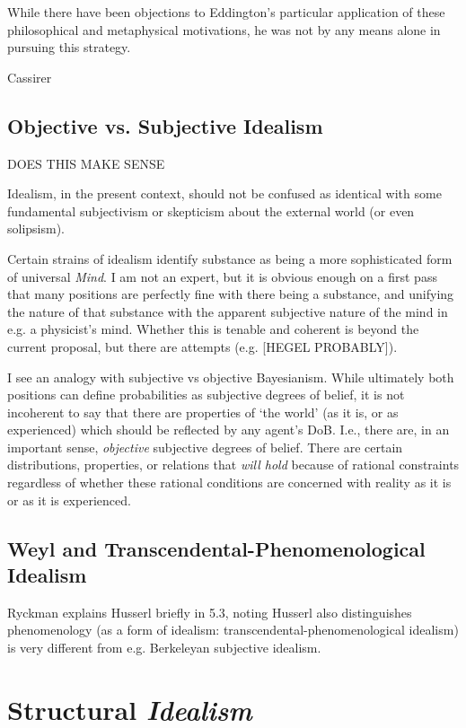 \documentclass{article}
\begin{document}
While there have been objections to Eddington's particular application of these philosophical and metaphysical motivations, he was not by any means alone in pursuing this strategy.  



Cassirer

\subsection{Objective vs. Subjective Idealism}

DOES THIS MAKE SENSE

Idealism, in the present context, should not be confused as identical with some fundamental subjectivism or skepticism about the external world (or even solipsism).

Certain strains of idealism identify substance as being a more sophisticated form of universal \emph{Mind}.  I am not an expert, but it is obvious enough on a first pass that many positions are perfectly fine with there being a substance, and unifying the nature of that substance with the apparent subjective nature of the mind in e.g. a physicist's mind.  Whether this is tenable and coherent is beyond the current proposal, but there are attempts (e.g. [HEGEL PROBABLY]).

I see an analogy with subjective vs objective Bayesianism.  While ultimately both positions can define probabilities as subjective degrees of belief, it is not incoherent to say that there are properties of `the world' (as it is, or as experienced) which should be reflected by any agent's DoB.  I.e., there are, in an important sense, \emph{objective} subjective degrees of belief.  There are certain distributions, properties, or relations that \emph{will hold} because of rational constraints regardless of whether these rational conditions are concerned with reality as it is or as it is experienced.



\subsection{Weyl and Transcendental-Phenomenological Idealism}

Ryckman explains Husserl briefly in 5.3, noting Husserl also distinguishes phenomenology (as a form of idealism: transcendental-phenomenological idealism) is very different from e.g. Berkeleyan subjective idealism.


\section{Structural \emph{Idealism}}
\end{document}
